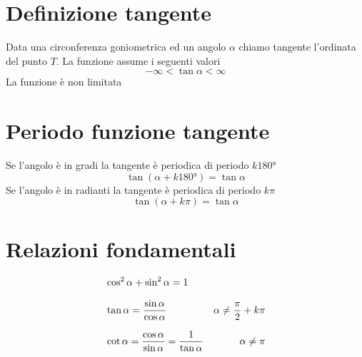 \section{Definizione tangente}
Data una circonferenza goniometrica ed un angolo $\alpha$ chiamo tangente l'ordinata del punto $T$.
La funzione assume i seguenti valori
\begin{equation*}
-\infty<\tan\alpha< \infty
\end{equation*}
La funzione è non limitata
{\centering
	
	\par}
\section{Periodo funzione tangente}
Se l'angolo è in gradi la tangente è periodica di periodo $k\ang{180}$
\begin{equation*}
\tan(\alpha+k\ang{180;;})=\tan\alpha
\end{equation*}
Se l'angolo è in radianti la tangente è periodica di periodo $k\pi$
\begin{equation*}
\tan(\alpha+k\pi)=\tan\alpha
\end{equation*}
\section{Relazioni fondamentali}
\begin{align*}	
	&\cos^{2}\alpha+\sin^{2}\alpha=1\\[.25cm]\index{Goniometria!relazione!fondamentale}
	&\tan\alpha={}\dfrac{\sin\alpha}{\cos\alpha}&\alpha\neq\dfrac{\pi}{2}+k\pi\\[.25cm]\index{Tangente!definizione}
	&\cot\alpha={}\dfrac{\cos\alpha}{\sin\alpha}={}\dfrac{1}{\tan\alpha}&\alpha\neq\pi\index{Cotangente!definizione}
\end{align*}
